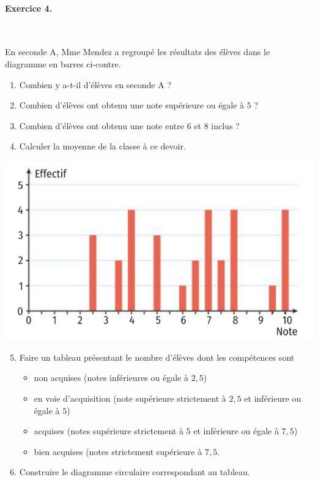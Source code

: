 \documentclass[11pt]{article}
\begin{document}
\paragraph{Exercice 4.}~\\
\begin{minipage}{.5\textwidth}
En seconde A, Mme Mendez a regroupé les résultats des élèves dans le
diagramme en barres ci-contre.
  \begin{enumerate}
    \item Combien y a-t-il d'élèves en seconde A ?
    \item Combien d'élèves ont obtenu une note supérieure ou égale à $5$ ?
    \item Combien d'élèves ont obtenu une note entre $6$ et $8$ inclus ?
    \item Calculer la moyenne de la classe à ce devoir.
  \end{enumerate}
\end{minipage}
\begin{minipage}{.5\textwidth}
  \begin{center}
\includegraphics[scale=.4]{notes.png}
  \end{center}
\end{minipage}
\begin{enumerate}
    \setcounter{enumi}{4}
  \item Faire un tableau présentant le nombre d'élèves dont les compétences sont
    \begin{itemize}
      \item non acquises (notes inférieures ou égale à $2,5$)
      \item en voie d'acquisition (note supérieure strictement à $2,5$ et
        inférieure ou égale à $5$)
      \item acquises (notes supérieure strictement à $5$ et inférieure ou égale
        à $7,5$)
      \item bien acquises (notes strictement supérieure à $7,5$.
    \end{itemize}
      \item Construire le diagramme circulaire correspondant au tableau.
\end{enumerate}
\end{document}

